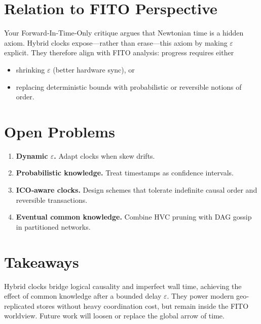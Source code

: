 \documentclass[../../../OAE-SPEC-MAIN.tex]{subfiles}
\begin{document}
\section{Relation to FITO Perspective}

Your Forward‑In‑Time‑Only critique argues that Newtonian time is a
hidden axiom.  Hybrid clocks expose—rather than erase—this axiom by
making $\varepsilon$ explicit.  They therefore align with FITO analysis:
progress requires either

\begin{itemize}
\item shrinking $\varepsilon$ (better hardware sync), or
\item replacing deterministic bounds with probabilistic or
      reversible notions of order.
\end{itemize}

\section{Open Problems}

\begin{enumerate}
\item \textbf{Dynamic $\varepsilon$.}  Adapt clocks when skew drifts.
\item \textbf{Probabilistic knowledge.}  Treat timestamps as confidence
      intervals.
\item \textbf{ICO‑aware clocks.}  Design schemes that tolerate
      indefinite causal order and reversible transactions.
\item \textbf{Eventual common knowledge.}  Combine HVC pruning with DAG
      gossip in partitioned networks.
\end{enumerate}

\section{Takeaways}

Hybrid clocks bridge logical causality and imperfect wall time,
achieving the effect of common knowledge after a bounded delay
$\varepsilon$.  They power modern geo‐replicated stores without heavy
coordination cost, but remain inside the FITO worldview.  Future work
will loosen or replace the global arrow of time.
\end{document}
